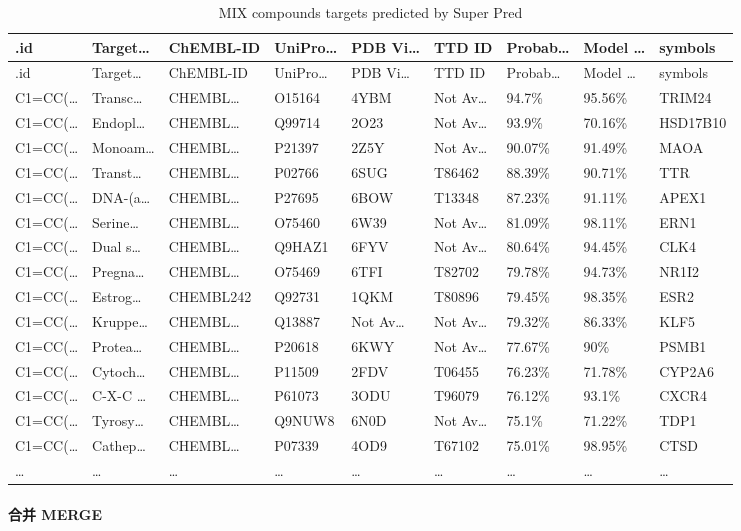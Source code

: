 \documentclass[
]{article}
\begin{document}
\begin{longtable}[]{@{}lllllllll@{}}
\caption{\label{tab:MIX-compounds-targets-predicted-by-Super-Pred}MIX compounds targets predicted by Super Pred}\tabularnewline
\toprule
.id & Target\ldots{} & ChEMBL-ID & UniPro\ldots{} & PDB Vi\ldots{} & TTD ID & Probab\ldots{} & Model \ldots{} & symbols\tabularnewline
\midrule
\endfirsthead
\toprule
.id & Target\ldots{} & ChEMBL-ID & UniPro\ldots{} & PDB Vi\ldots{} & TTD ID & Probab\ldots{} & Model \ldots{} & symbols\tabularnewline
\midrule
\endhead
C1=CC(\ldots{} & Transc\ldots{} & CHEMBL\ldots{} & O15164 & 4YBM & Not Av\ldots{} & 94.7\% & 95.56\% & TRIM24\tabularnewline
C1=CC(\ldots{} & Endopl\ldots{} & CHEMBL\ldots{} & Q99714 & 2O23 & Not Av\ldots{} & 93.9\% & 70.16\% & HSD17B10\tabularnewline
C1=CC(\ldots{} & Monoam\ldots{} & CHEMBL\ldots{} & P21397 & 2Z5Y & Not Av\ldots{} & 90.07\% & 91.49\% & MAOA\tabularnewline
C1=CC(\ldots{} & Transt\ldots{} & CHEMBL\ldots{} & P02766 & 6SUG & T86462 & 88.39\% & 90.71\% & TTR\tabularnewline
C1=CC(\ldots{} & DNA-(a\ldots{} & CHEMBL\ldots{} & P27695 & 6BOW & T13348 & 87.23\% & 91.11\% & APEX1\tabularnewline
C1=CC(\ldots{} & Serine\ldots{} & CHEMBL\ldots{} & O75460 & 6W39 & Not Av\ldots{} & 81.09\% & 98.11\% & ERN1\tabularnewline
C1=CC(\ldots{} & Dual s\ldots{} & CHEMBL\ldots{} & Q9HAZ1 & 6FYV & Not Av\ldots{} & 80.64\% & 94.45\% & CLK4\tabularnewline
C1=CC(\ldots{} & Pregna\ldots{} & CHEMBL\ldots{} & O75469 & 6TFI & T82702 & 79.78\% & 94.73\% & NR1I2\tabularnewline
C1=CC(\ldots{} & Estrog\ldots{} & CHEMBL242 & Q92731 & 1QKM & T80896 & 79.45\% & 98.35\% & ESR2\tabularnewline
C1=CC(\ldots{} & Kruppe\ldots{} & CHEMBL\ldots{} & Q13887 & Not Av\ldots{} & Not Av\ldots{} & 79.32\% & 86.33\% & KLF5\tabularnewline
C1=CC(\ldots{} & Protea\ldots{} & CHEMBL\ldots{} & P20618 & 6KWY & Not Av\ldots{} & 77.67\% & 90\% & PSMB1\tabularnewline
C1=CC(\ldots{} & Cytoch\ldots{} & CHEMBL\ldots{} & P11509 & 2FDV & T06455 & 76.23\% & 71.78\% & CYP2A6\tabularnewline
C1=CC(\ldots{} & C-X-C \ldots{} & CHEMBL\ldots{} & P61073 & 3ODU & T96079 & 76.12\% & 93.1\% & CXCR4\tabularnewline
C1=CC(\ldots{} & Tyrosy\ldots{} & CHEMBL\ldots{} & Q9NUW8 & 6N0D & Not Av\ldots{} & 75.1\% & 71.22\% & TDP1\tabularnewline
C1=CC(\ldots{} & Cathep\ldots{} & CHEMBL\ldots{} & P07339 & 4OD9 & T67102 & 75.01\% & 98.95\% & CTSD\tabularnewline
\ldots{} & \ldots{} & \ldots{} & \ldots{} & \ldots{} & \ldots{} & \ldots{} & \ldots{} & \ldots{}\tabularnewline
\bottomrule
\end{longtable}

\hypertarget{ux5408ux5e76-merge}{%
\paragraph{合并 MERGE}\label{ux5408ux5e76-merge}}
\end{document}
